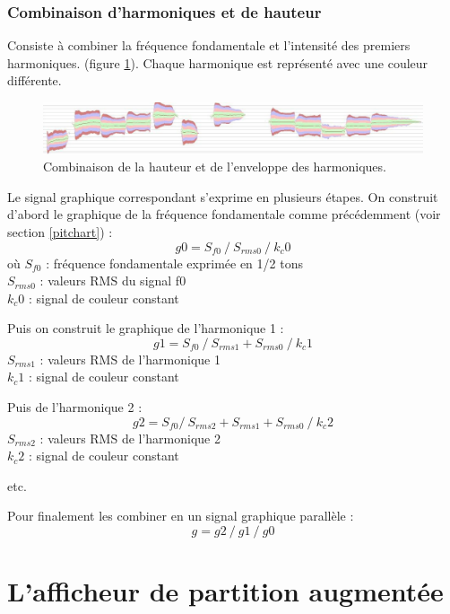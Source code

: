 \documentclass{article}
\newcommand{\rshift}			{\hspace*{4mm}}
\begin{document}
\subsubsection{Combinaison d'harmoniques et de hauteur}
Consiste à combiner la fréquence fondamentale et l'intensité des premiers harmoniques. 
(figure \ref{fig:pitchedstackedharm}). Chaque harmonique est représenté avec une couleur différente.
\begin{figure}[htbp]
\centerline{
	\includegraphics[width=0.99\columnwidth]{imgs/curves/pitchedstackedharm}}
\caption{Combinaison de la hauteur et de l'enveloppe des harmoniques.}
\label{fig:pitchedstackedharm}
\end{figure}

Le signal graphique correspondant s'exprime en plusieurs étapes. On construit d'abord le graphique de la fréquence fondamentale comme précédemment (voir section \ref{pitchart}) :
\[ g0 = S_{f0}\ /\ S_{rms0}\ /\ k_c0 \]
où $S_{f0}$ : fréquence fondamentale  exprimée en 1/2 tons\\
\rshift	 $S_{rms0}$ : valeurs RMS du signal f0 \\
\rshift $k_c0$ : signal de couleur constant 

\vspace{2mm}
Puis on construit le graphique de l'harmonique 1 :
\[ g1 = S_{f0} \ /\ S_{rms1} + S_{rms0}\ /\ k_c1 \]
\rshift	 $S_{rms1}$ : valeurs RMS de l'harmonique 1 \\
\rshift $k_c1$ : signal de couleur constant 

\vspace{2mm}
Puis de l'harmonique 2 :
\[ g2 = S_{f0} /\ S_{rms2} + S_{rms1}  + S_{rms0} \ /\ k_c2 \]
\rshift	 $S_{rms2}$ : valeurs RMS de l'harmonique 2 \\
\rshift $k_c2$ : signal de couleur constant 

\vspace{1mm}
etc.

\vspace{2mm}
Pour finalement les combiner en un signal graphique parallèle :
\[ g = g2 \ /\  g1 \ /\ g0 \]



\section{L'afficheur de partition augmentée}
\end{document}
